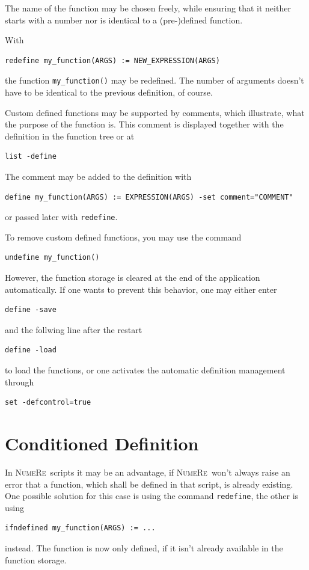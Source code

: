 \documentclass[DIV=14,headsepline,footsepline]{scrbook}
\newcommand{\NR}{\textsc{Nu\-me\-Re}}
\begin{document}
				The name of the function may be chosen freely, while ensuring that it neither starts with a number nor is identical to a (pre-)defined function.
				
				With
				\begin{lstlisting}
redefine my_function(ARGS) := NEW_EXPRESSION(ARGS)
				\end{lstlisting}
				the function \lstinline+my_function()+ may be redefined. The number of arguments doesn't have to be identical to the previous definition, of course.
				
				Custom defined functions may be supported by comments, which illustrate, what the purpose of the function is. This comment is displayed together with the definition in the function tree or at
				\begin{lstlisting}
list -define
				\end{lstlisting}
				
				The comment may be added to the definition with
				\begin{lstlisting}
define my_function(ARGS) := EXPRESSION(ARGS) -set comment="COMMENT"
				\end{lstlisting}
				or passed later with \lstinline+redefine+.
				
				To remove custom defined functions, you may use the command
				\begin{lstlisting}
undefine my_function()
				\end{lstlisting}
				However, the function storage is cleared at the end of the application automatically. If one wants to prevent this behavior, one may either enter
				\begin{lstlisting}
define -save
				\end{lstlisting}
				and the follwing line after the restart
				\begin{lstlisting}
define -load
				\end{lstlisting}
				to load the functions, or one activates the automatic definition management through
				\begin{lstlisting}
set -defcontrol=true
				\end{lstlisting}
				
			\section{Conditioned Definition}
				In \NR\ scripts it may be an advantage, if \NR\ won't always raise an error that a function, which shall be defined in that script, is already existing. One possible solution for this case is using the command \lstinline+redefine+, the other is using
				\begin{lstlisting}
ifndefined my_function(ARGS) := ...
				\end{lstlisting}
				instead. The function is now only defined, if it isn't already available in the function storage.
\end{document}
